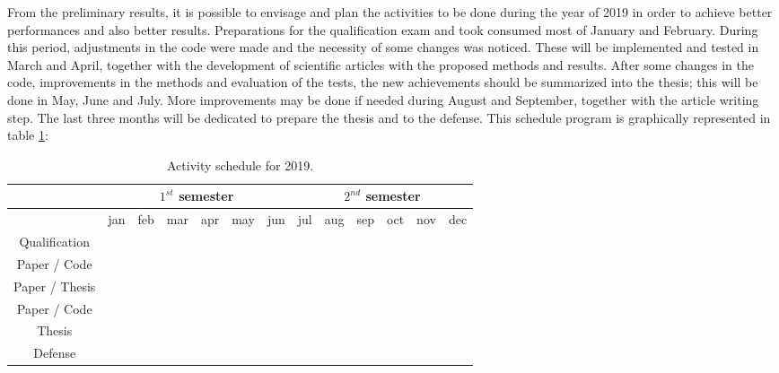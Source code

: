 From the preliminary results, it is possible to envisage and plan the activities to be done during the year of 2019 in order to achieve better performances and also better results. Preparations for the qualification exam and took consumed most of January and February. During this period, adjustments in the code were made and the necessity of some changes was noticed. These will be implemented and tested in March and April, together with the development of scientific articles with the proposed methods and results. After some changes in the code, improvements in the methods and evaluation of the tests, the new achievements should be summarized into the thesis; this will be done in May, June and July. More improvements may be done if needed during August and September, together with the article writing step. The last three months will be dedicated to prepare the thesis and to the defense. This schedule program is graphically represented in table \ref{tab:activity_schedule}:

\begin{table}[H]
    \caption{Activity schedule for 2019.}\label{tab:activity_schedule}
    \begin{center}
    \begin{tabular}{|c|c|c|c|c|c|c|c|c|c|c|c|c|}
        \hline
   
        & \multicolumn{6}{c|}{$1^{st}$ semester} 
        & \multicolumn{6}{c|}{$2^{nd}$ semester}\\
        \hline
   
        & jan & feb & mar & apr & may & jun 
        & jul & aug & sep & oct & nov & dec\\
        \hline
        
        Qualification
        & \cellcolor{gray} & \cellcolor{gray} &  &  &  &  
        &  &  &  &  &  & \\
        \hline
        
        Paper / Code
        &  & \cellcolor{gray} & \cellcolor{gray} & \cellcolor{gray} &  & &  &  &  &  &  & \\
        \hline
        
        Paper / Thesis
        &  &  &  &  & \cellcolor{gray} & \cellcolor{gray} & \cellcolor{gray} &  &  &  &  & \\
        \hline
        
        Paper / Code
        &  &  &  &  & &  &  & \cellcolor{gray} & \cellcolor{gray} &  &  & \\
        \hline
        
        Thesis
        &  &  &  &  & &  &  &  &  & \cellcolor{gray} & \cellcolor{gray} & \\
        \hline
        
        Defense
        &  &  &  &  & &  &  &  &  &  &  & \cellcolor{gray}\\
        \hline
    \end{tabular}
    \end{center}
    \fautor
\end{table}